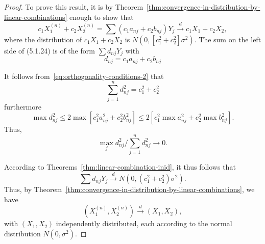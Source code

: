 \begin{proof}
	To prove this result, it is by Theorem~\ref{thm:convergence-in-distribution-by-linear-combinations} enough to show that
	\begin{equation*}
		c_{1} X_{1}^{(n)}+c_{2} X_{2}^{(n)}=\sum\left(c_{1} a_{nj}+c_{2} b_{nj}\right) Y_{j} \stackrel{d}{\rightarrow}c_{1} X_{1}+c_{2} X_{2},
	\end{equation*}
	where the distribution of \(c_{1} X_{1}+c_{2} X_{2}\) is \(N\left(0,\left[c_{1}^2+c_{2}^2\right] \sigma^2\right)\). The sum on the left side of (5.1.24) is of the form \(\sum d_{nj} Y_{j}\) with
	\begin{equation*}
		d_{nj}=c_{1} a_{nj}+c_{2} b_{nj}
	\end{equation*}

	It follows from~\eqref{eq:orthogonality-conditions-2} that
	\begin{equation*}
		\sum_{j=1}^{n}d_{nj}^2=c_{1}^2+c_{2}^2
	\end{equation*}
	furthermore
	\begin{equation*}
		\max d_{nj}^2\leq 2\max\left[c_{1}^2a_{nj}^2+c_{2}^2 b_{nj}^2\right]\leq 2\left[c_{1}^2 \max a_{nj}^2+c_{2}^2\max b_{nj}^2\right].
	\end{equation*}
	Thus,
	\begin{equation*}
		\max_{j}d_{nj}^{2}/\sum_{j=1}^{n}d_{nj}^{2}\rightarrow 0.
	\end{equation*}

	According to Theorems~\ref{thm:linear-combination-inid}, it thus follows that
	\begin{equation*}
		\sum d_{nj} Y_{j} \stackrel{d}{\rightarrow}N\left(0,\left(c_{1}^2+c_{2}^2\right) \sigma^2\right).
	\end{equation*}
	Thus, by Theorem~\ref{thm:convergence-in-distribution-by-linear-combinations}, we have
	\begin{equation*}
		(X_{1}^{(n)},X_{2}^{(n)})\stackrel{d}{\rightarrow}(X_{1},X_{2}),
	\end{equation*}
	with \((X_{1},X_{2})\) independently distributed, each according to the normal distribution \(N\left(0,\sigma^2\right)\).
\end{proof}
